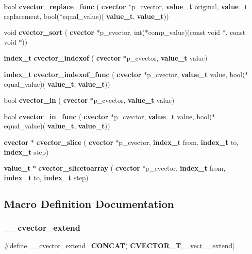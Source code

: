 \begin{DoxyCompactItemize}
\item 
bool \textbf{ cvector\+\_\+replace\+\_\+func} (\textbf{ cvector} $\ast$p\+\_\+cvector, \textbf{ value\+\_\+t} original, \textbf{ value\+\_\+t} replacement, bool($\ast$equal\+\_\+value)(\textbf{ value\+\_\+t}, \textbf{ value\+\_\+t}))
\item 
void \textbf{ cvector\+\_\+sort} (\textbf{ cvector} $\ast$p\+\_\+cvector, int($\ast$comp\+\_\+value)(const void $\ast$, const void $\ast$))
\item 
\textbf{ index\+\_\+t} \textbf{ cvector\+\_\+indexof} (\textbf{ cvector} $\ast$p\+\_\+cvector, \textbf{ value\+\_\+t} value)
\item 
\textbf{ index\+\_\+t} \textbf{ cvector\+\_\+indexof\+\_\+func} (\textbf{ cvector} $\ast$p\+\_\+cvector, \textbf{ value\+\_\+t} value, bool($\ast$equal\+\_\+value)(\textbf{ value\+\_\+t}, \textbf{ value\+\_\+t}))
\item 
bool \textbf{ cvector\+\_\+in} (\textbf{ cvector} $\ast$p\+\_\+cvector, \textbf{ value\+\_\+t} value)
\item 
bool \textbf{ cvector\+\_\+in\+\_\+func} (\textbf{ cvector} $\ast$p\+\_\+cvector, \textbf{ value\+\_\+t} value, bool($\ast$equal\+\_\+value)(\textbf{ value\+\_\+t}, \textbf{ value\+\_\+t}))
\item 
\textbf{ cvector} $\ast$ \textbf{ cvector\+\_\+slice} (\textbf{ cvector} $\ast$p\+\_\+cvector, \textbf{ index\+\_\+t} from, \textbf{ index\+\_\+t} to, \textbf{ index\+\_\+t} step)
\item 
\textbf{ value\+\_\+t} $\ast$ \textbf{ cvector\+\_\+slicetoarray} (\textbf{ cvector} $\ast$p\+\_\+cvector, \textbf{ index\+\_\+t} from, \textbf{ index\+\_\+t} to, \textbf{ index\+\_\+t} step)
\end{DoxyCompactItemize}


\subsection{Macro Definition Documentation}
\mbox{\label{cvector__interface_8h_a215ba71bba887f23a6b87fa73888b65d}} 
\subsubsection{\+\_\+\+\_\+cvector\+\_\+extend}
{\footnotesize\ttfamily \#define \+\_\+\+\_\+cvector\+\_\+extend~\textbf{ C\+O\+N\+C\+AT}(\textbf{ C\+V\+E\+C\+T\+O\+R\+\_\+T}, \+\_\+vect\+\_\+\+\_\+extend)}



